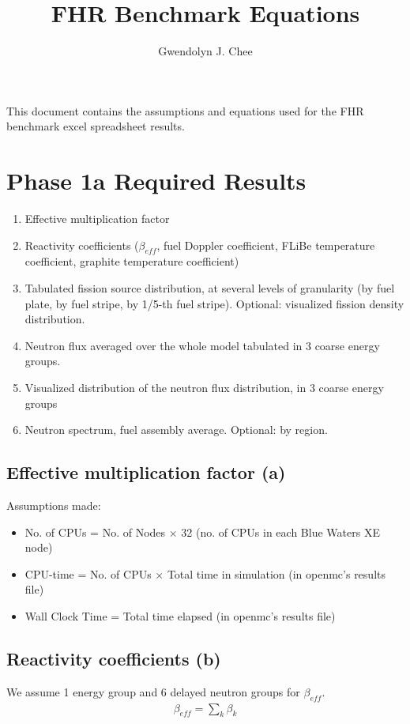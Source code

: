\documentclass[letterpaper,11pt]{article}
\author{Gwendolyn J. Chee}
\title{FHR Benchmark Equations }
\begin{document}
\maketitle
\hrulefill
\onehalfspacing

This document contains the assumptions and equations used for the FHR 
benchmark excel spreadsheet results. 

\section{Phase 1a Required Results}
\begin{enumerate}[label=(\alph*)]
    \item Effective multiplication factor 
    \item Reactivity coefficients ($\beta_{eff}$, fuel Doppler coefficient, FLiBe 
    temperature coefficient, graphite temperature coefficient)
    \item Tabulated fission source distribution, at several levels of granularity 
    (by fuel plate, by fuel stripe, by 1/5-th fuel stripe). Optional: visualized fission 
    density distribution.
    \item Neutron flux averaged over the whole model tabulated in 3 coarse energy groups. 
    \item Visualized distribution of the neutron flux distribution, in 3 coarse energy groups
    \item Neutron spectrum, fuel assembly average. Optional: by region.
\end{enumerate}

\subsection{Effective multiplication factor (a)}
Assumptions made: 
\begin{itemize}
    \item No. of CPUs = No. of Nodes $\times$ 32 (no. of CPUs in each Blue Waters XE node)
    \item CPU-time = No. of CPUs $\times$ Total time in simulation (in openmc's results file)
    \item Wall Clock Time = Total time elapsed (in openmc's results file)
\end{itemize}

\subsection{Reactivity coefficients (b)}
We assume 1 energy group and 6 delayed neutron groups for $\beta_{eff}$. 
\begin{align*}
    \beta_{eff} = \sum_k \beta_k
\end{align*}
\end{document}
